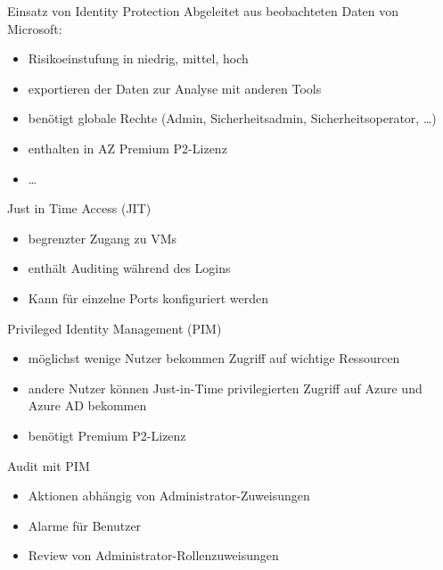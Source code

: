 \begin{flashcard}[Definition]{Einsatz von Identity Protection}
  Abgeleitet aus beobachteten Daten von Microsoft:
  \begin{itemize}
    \item Risikoeinstufung in niedrig, mittel, hoch
    \item exportieren der Daten zur Analyse mit anderen Tools
    \item benötigt globale Rechte (Admin, Sicherheitsadmin, Sicherheitsoperator, \ldots)
    \item enthalten in AZ Premium P2-Lizenz
    \item \ldots
  \end{itemize}
\end{flashcard}

\begin{flashcard}[Definition]{Just in Time Access (JIT)}
  \begin{itemize}
    \item begrenzter Zugang zu VMs
    \item enthält Auditing während des Logins
    \item Kann für einzelne Ports konfiguriert werden
  \end{itemize}
\end{flashcard}

\begin{flashcard}[Definition]{Privileged Identity Management (PIM)}
  \begin{itemize}
    \item möglichst wenige Nutzer bekommen Zugriff auf wichtige Ressourcen
    \item andere Nutzer können Just-in-Time privilegierten Zugriff auf Azure und Azure AD bekommen
    \item benötigt Premium P2-Lizenz
  \end{itemize}
\end{flashcard}

\begin{flashcard}[]{Audit mit PIM}
  \begin{itemize}
    \item Aktionen abhängig von Administrator-Zuweisungen
    \item Alarme für Benutzer
    \item Review von Administrator-Rollenzuweisungen
  \end{itemize}
\end{flashcard}

